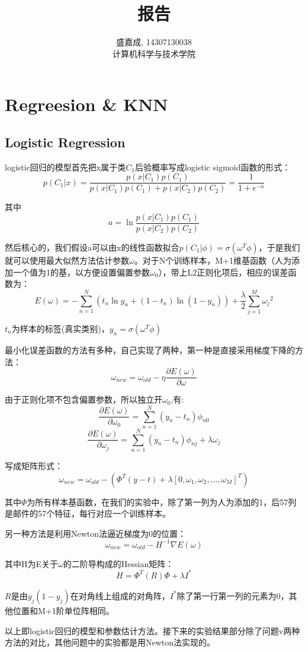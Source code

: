 \documentclass[hyperref,UTF8]{ctexart}
\begin{document}
\title{报告}
\author{盛嘉成, 14307130038 \\ 计算机科学与技术学院}
\maketitle
\section{Regreesion \& KNN}
\subsection{Logistic Regression}
logistic回归的模型首先把x属于类$C_1$后验概率写成logistic sigmoid函数的形式：
\[p(C_1|x)=\frac{p(x|C_1)p(C_1)}{p(x|C_1)p(C_1)+p(x|C_2)p(C_2)}=\frac{1}{1+e^{-a}}\]
\par 其中
\[a=\ln{\frac{p(x|C_1)p(C_1)}{p(x|C_2)p(C_2)}}\]
\par 然后核心的，我们假设a可以由x的线性函数拟合$p(C_1|\phi)=\sigma(\omega^{T}\phi)$，于是我们就可以使用最大似然方法估计参数$\omega$。对于N个训练样本，M+1维基函数（人为添加一个值为1的基，以方便设置偏置参数$\omega_0$），带上L2正则化项后，相应的误差函数为：
\[E(\omega)=-\sum_{n=1}^{N}(t_n\ln{y_n}+(1-t_n)\ln{(1-y_n)})+\frac{\lambda}{2} \sum_{j=1}^{M}{\omega_j}^2\]
\par $t_n$为样本的标签(真实类别)，$y_n=\sigma(\omega^{T}\phi)$
\par 最小化误差函数的方法有多种，自己实现了两种，第一种是直接采用梯度下降的方法：
\[\omega_{new} =\omega_{old}-\eta \frac{\partial E(\omega)}{\partial \omega} \]
\par 由于正则化项不包含偏置参数，所以独立开$\omega_0$,有:
\[\frac{\partial E(\omega)}{\partial \omega_0}=\sum_{n=1}^{N}(y_n-t_n)\phi_{n0}\]
\[\frac{\partial E(\omega)}{\partial \omega_j}=\sum_{n=1}^{N}(y_n-t_n)\phi_{nj}+\lambda \omega_j\]
\par 写成矩阵形式：
\[\omega_{new} =\omega_{old}-({\Phi}^{T}(y-t)+\lambda [0,\omega_1,\omega_2,...,\omega_M]^T)\]
\par 其中$\Phi$为所有样本基函数，在我们的实验中，除了第一列为人为添加的1，后57列是邮件的57个特征，每行对应一个训练样本。

\par 另一种方法是利用Newton法逼近梯度为0的位置：
\[\omega_{new} =\omega_{old}-H^{-1}\nabla E(\omega)\]
\par 其中H为E关于$\omega$的二阶导构成的Hessian矩阵：
\[H={\Phi}^{T}(R)\Phi+\lambda I^{*}\]
\par $R$是由$y_j(1-y_j)$在对角线上组成的对角阵，$I^{*}$除了第一行第一列的元素为0，其他位置和M+1阶单位阵相同。
\par 以上即logistic回归的模型和参数估计方法。接下来的实验结果部分除了问题v两种方法的对比，其他问题中的实验都是用Newton法实现的。
\end{document}
